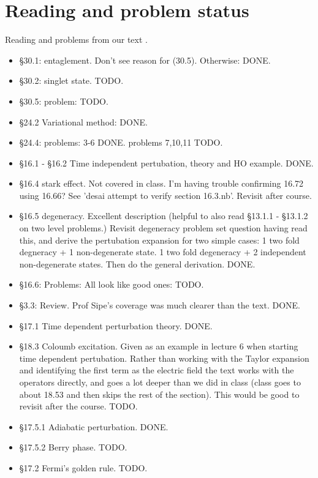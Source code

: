 \chapter{Reading and problem status}

Reading and problems from our text \cite{desai2009quantum}.

\begin{itemize}
\item \S 30.1: entaglement.  Don't see reason for (30.5).  Otherwise: DONE.
\item \S 30.2: singlet state.  TODO.
\item \S 30.5: problem: TODO.
\item \S 24.2 Variational method: DONE.
\item \S 24.4: problems: 3-6 DONE.  problems 7,10,11 TODO.
\item \S 16.1 - \S 16.2 Time independent pertubation, theory and HO example.  DONE.
\item \S 16.4 stark effect.  Not covered in class.  I'm having trouble confirming 16.72 using 16.66?  See 'desai attempt to verify section 16.3.nb'.  Revisit after course.
\item \S 16.5 degeneracy.  Excellent description (helpful to also read \S 13.1.1 - \S 13.1.2 on two level problems.)  Revisit degeneracy problem set question having read this, and derive the pertubation expansion for two simple cases: 1 two fold degneracy + 1 non-degenerate state.  1 two fold degeneracy + 2 independent non-degenerate states.  Then do the general derivation.  DONE.
\item \S 16.6: Problems: All look like good ones: TODO.
\item \S 3.3: Review.  Prof Sipe's coverage was much clearer than the text.  DONE.
\item \S 17.1 Time dependent perturbation theory.  DONE.
\item \S 18.3 Coloumb excitation.  Given as an example in lecture 6 when starting time dependent pertubation.  Rather than working with the Taylor expansion and identifying the first term as the electric field the text works with the operators directly, and goes a lot deeper than we did in class (class goes to about 18.53 and then skips the rest of the section).  This would be good to revisit after the course.  TODO.
\item \S 17.5.1 Adiabatic perturbation.  DONE.
\item \S 17.5.2 Berry phase. TODO.
\item \S 17.2 Fermi's golden rule. TODO.

\end{itemize}
